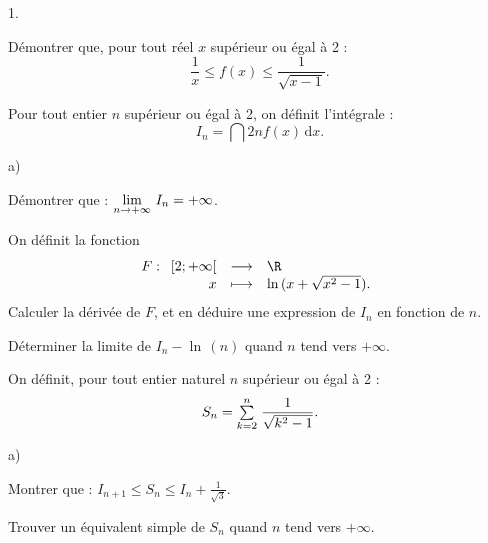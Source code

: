 \documentclass[11pt]{article}%
\begin{document}
\begin{noliste}{1.}
 \setlength{\itemsep}{4mm}
\item Démontrer que, pour tout réel $x$ supérieur ou égal 
à 2 : 
\[
\frac{1}{x}\leq f(x)\leq \frac{1}{\sqrt{x-1}}.
\]

\item Pour tout entier $n$ supérieur ou égal à 2, on définit
l'intégrale : 
\[
I_{n} = \dint{2}{n}{f(x)}\, \mathrm{d}x.
\]

\begin{noliste}{a)}
 \setlength{\itemsep}{2mm}
\item Démontrer que : $ {\displaystyle \lim_{n\rightarrow + \infty
} \ }I_{n} = + \infty $.

\item On définit la fonction 
\[
F :\begin{array}[t]{rcl}
\lbrack 2;{+ \infty }[ & \longrightarrow & {\R\xspace} \\
x & \longmapsto & {\ln \,(x + \sqrt{x^{2}-1}).}
\end{array}
\]
Calculer la dérivée de $F$, et en déduire une expression de $I_{n}$ en
fonction de $n$.

\item Déterminer la limite de $I_{n}-\ln \,(n)$ quand $n$ tend vers $ +
\infty $.
\end{noliste}

\item On définit, pour tout entier naturel $n$ supérieur ou égal 
à 2 : 
\[
S_{n} = {\textstyle\sum\limits_{k = 2}^{n}}\hspace{.1cm}\frac{1}{\sqrt{k^{2}-1}}.
\]

\begin{noliste}{a)}
 \setlength{\itemsep}{2mm}
\item Montrer que : $I_{n + 1}\leq S_{n}\leq I_{n} +
\frac{1}{\sqrt{3}}.$

\item Trouver un équivalent simple de $S_{n}$ quand $n$ tend vers $ +
\infty $.
\end{noliste}
\end{noliste}
\end{document}
